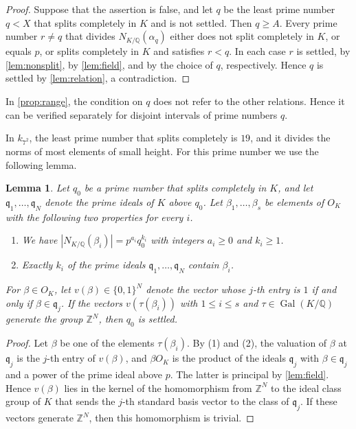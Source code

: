 \documentclass[11pt]{amsart}
\theoremstyle{plain}
\newtheorem{lemma}[theorem]{Lemma}
\theoremstyle{definition}
\begin{document}
\begin{proof}
Suppose that the assertion is false, and let $q$ be the least prime number $q < X$ that splits completely in $K$ and is not settled.
Then $q \ge A$.
Every prime number $r \ne q$ that divides $N_{K/\mathbb{Q}}(\alpha_q)$ either does not split completely in $K$, or equals $p$, or splits completely in $K$ and satisfies $r < q$.
In each case $r$ is settled, by \cref{lem:nonsplit}, by \cref{lem:field}, and by the choice of $q$, respectively.
Hence $q$ is settled by \cref{lem:relation}, a contradiction.
\end{proof}

In \cref{prop:range}, the condition on $q$ does not refer to the other relations.
Hence it can be verified separately for disjoint intervals of prime numbers $q$.

In $k_{7^2}$, the least prime number that splits completely is $19$, and it divides the norms of most elements of small height.
For this prime number we use the following lemma.

\begin{lemma} \label{lem:block}
Let $q_0$ be a prime number that splits completely in $K$, and let $\mathfrak{q}_1, \ldots, \mathfrak{q}_N$ denote the prime ideals of $K$ above $q_0$.
Let $\beta_1, \ldots, \beta_s$ be elements of $O_K$ with the following two properties for every $i$.
\begin{enumerate}
\item We have $|N_{K/\mathbb{Q}}(\beta_i)| = p^{a_i} q_0^{k_i}$ with integers $a_i \ge 0$ and $k_i \ge 1$.
\item Exactly $k_i$ of the prime ideals $\mathfrak{q}_1, \ldots, \mathfrak{q}_N$ contain $\beta_i$.
\end{enumerate}
For $\beta \in O_K$, let $v(\beta) \in \{0,1\}^N$ denote the vector whose $j$-th entry is $1$ if and only if $\beta \in \mathfrak{q}_j$.
If the vectors $v(\tau(\beta_i))$ with $1 \le i \le s$ and $\tau \in \operatorname{Gal}(K/\mathbb{Q})$ generate the group $\mathbb{Z}^N$, then $q_0$ is settled.
\end{lemma}

\begin{proof}
Let $\beta$ be one of the elements $\tau(\beta_i)$.
By (1) and (2), the valuation of $\beta$ at $\mathfrak{q}_j$ is the $j$-th entry of $v(\beta)$, and $\beta O_K$ is the product of the ideals $\mathfrak{q}_j$ with $\beta \in \mathfrak{q}_j$ and a power of the prime ideal above $p$.
The latter is principal by \cref{lem:field}.
Hence $v(\beta)$ lies in the kernel of the homomorphism from $\mathbb{Z}^N$ to the ideal class group of $K$ that sends the $j$-th standard basis vector to the class of $\mathfrak{q}_j$.
If these vectors generate $\mathbb{Z}^N$, then this homomorphism is trivial.
\end{proof}
\end{document}
